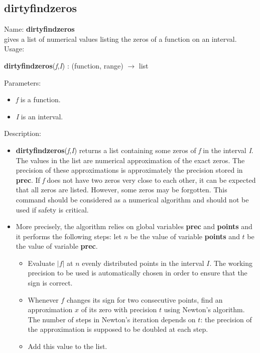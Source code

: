 \subsection{dirtyfindzeros}
\label{labdirtyfindzeros}
\noindent Name: \textbf{dirtyfindzeros}\\
gives a list of numerical values listing the zeros of a function on an interval.\\
\noindent Usage: 
\begin{center}
\textbf{dirtyfindzeros}(\emph{f},\emph{I}) : (\textsf{function}, \textsf{range}) $\rightarrow$ \textsf{list}\\
\end{center}
Parameters: 
\begin{itemize}
\item \emph{f} is a function.
\item \emph{I} is an interval.
\end{itemize}
\noindent Description: \begin{itemize}

\item \textbf{dirtyfindzeros}(\emph{f},\emph{I}) returns a list containing some zeros of \emph{f} in the
   interval \emph{I}. The values in the list are numerical approximation of the exact
   zeros. The precision of these approximations is approximately the precision
   stored in \textbf{prec}. If \emph{f} does not have two zeros very close to each other, it 
   can be expected that all zeros are listed. However, some zeros may be
   forgotten. This command should be considered as a numerical algorithm and
   should not be used if safety is critical.

\item More precisely, the algorithm relies on global variables \textbf{prec} and \textbf{points} and it performs the following steps: 
   let $n$ be the value of variable \textbf{points} and $t$ be the value
   of variable \textbf{prec}.
   \begin{itemize}
   \item Evaluate $|f|$ at $n$ evenly distributed points in the interval $I$.
     The working precision to be used is automatically chosen in order to ensure that the sign
     is correct.
   \item Whenever $f$ changes its sign for two consecutive points,
     find an approximation $x$ of its zero with precision $t$ using
     Newton's algorithm. The number of steps in Newton's iteration depends on $t$:
     the precision of the approximation is supposed to be doubled at each step.
   \item Add this value to the list.
   \end{itemize}
\end{itemize}
